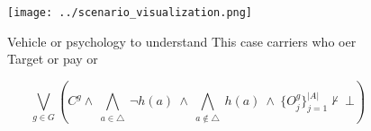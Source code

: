 \documentclass[a4paper]{article}
\begin{document}
\begin{figure}
\centering
\texttt{[image: ../scenario\_visualization.png]}
\caption{Vehicle or psychology to understand This case carriers who oer Target or pay or
}
\end{figure}
 
\[\bigvee_{g\in G} (C^g \wedge\ \bigwedge_{a\in \triangle}\ \neg h(a)\ \wedge\ \bigwedge_{a\notin \triangle}\ h(a)\ \wedge\ \{O_j^g\}_{j=1}^{|A|} \nvdash\ \bot )\]
\end{document}
